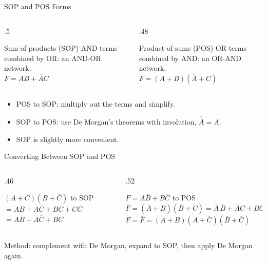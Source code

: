 \documentclass[9pt,aspectratio=169,xcolor=table]{beamer}
\begin{document}
\begin{frame}{SOP and POS Forms}
  \begin{columns}[t]
  \begin{column}{.5\textwidth}
    \begin{block}{Sum-of-products (SOP)}
      \small AND terms combined by OR: an \alert{AND-OR} network.\\
      $F = AB + \overline{A}C$
    \end{block}
  \end{column}
  \begin{column}{.48\textwidth}
    \begin{block}{Product-of-sums (POS)}
      \small OR terms combined by AND: an \alert{OR-AND} network.\\
      $F = (A+B)(\overline{A}+C)$
    \end{block}
  \end{column}
  \end{columns}
  \vspace{2mm}
  \begin{itemize}\small\itemsep2pt
    \item POS to SOP: multiply out the terms and simplify.
    \item SOP to POS: use De Morgan's theorems with involution, $\overline{\overline{A}} = A$.
    \item SOP is slightly more convenient.
  \end{itemize}
\end{frame}

\begin{frame}{Converting Between SOP and POS}
  \begin{columns}[t]
  \begin{column}{.46\textwidth}
    \begin{block}{$(A+C)(B+\overline{C})$ to SOP}
      \small
      $= AB + A\overline{C} + BC + C\overline{C}$\\
      $= AB + A\overline{C} + BC$
    \end{block}
  \end{column}
  \begin{column}{.52\textwidth}
    \begin{block}{$F = A\overline{B} + B\overline{C}$ to POS}
      \scriptsize
      $\overline{F} = (\overline{A}+B)(\overline{B}+C) = \overline{A}\,\overline{B} + \overline{A}C + BC$\\[1mm]
      $F = \overline{\overline{F}} = (A+B)(A+\overline{C})(\overline{B}+\overline{C})$
    \end{block}
  \end{column}
  \end{columns}
  \vspace{2mm}
  {\small Method: complement with De Morgan, expand to SOP, then apply De Morgan again.}
\end{frame}
\end{document}
